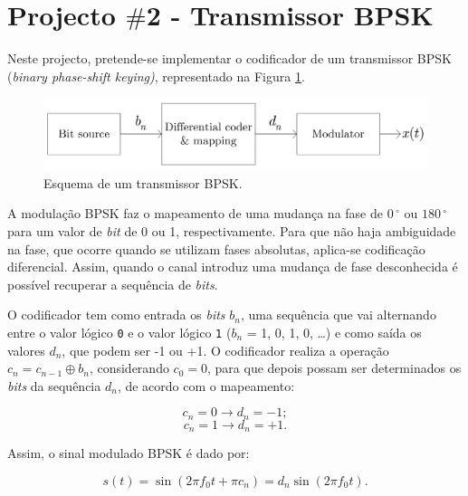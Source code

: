 \documentclass[11pt]{article}
\numberwithin{equation}{section}
\begin{document}
\pagebreak

\section{Projecto $\#$2 - Transmissor BPSK}

Neste projecto, pretende-se implementar o codificador de um transmissor BPSK (\textit{binary phase-shift keying)}, representado na Figura \ref{fig:BPSK}.

\begin{figure}[H]
	\centering
	\includegraphics[keepaspectratio=true, scale=0.5]{teoricas/bpsk}
	\caption{Esquema de um transmissor BPSK.}
	\vspace{-0.8em}
	\label{fig:BPSK}
\end{figure}

A modulação BPSK faz o mapeamento de uma mudança na fase de $0\,^{\circ}$ ou $180\,^{\circ}$ para um valor de \textit{bit} de 0 ou 1, respectivamente. Para que não haja ambiguidade na fase, que ocorre quando se utilizam fases absolutas, aplica-se codificação diferencial. Assim, quando o canal introduz uma mudança de fase desconhecida é possível recuperar a sequência de \textit{bits}.

O codificador tem como entrada os \textit{bits} $b_n$, uma sequência que vai alternando entre o valor lógico \texttt{0} e o valor lógico \texttt{1} ($b_n$ = 1, 0, 1, 0, \ldots) e como saída os valores $d_n$, que podem ser -1 ou +1. O codificador realiza a operação $c_n = c_{n-1} \oplus b_n$, considerando $c_0 = 0$, para que depois possam ser determinados os \textit{bits} da sequência $d_n$, de acordo com o mapeamento:

\vspace{-3mm}
\begin{equation}
	c_{n} = 0 \to d_{n} = -1;
	\label{eq:cn0}
\end{equation}
\begin{equation}	
	c_{n} = 1 \to d_{n} = +1.
	\label{eq:cn1}  
\end{equation} 

\vspace{1mm}
Assim, o sinal modulado BPSK é dado por:

\vspace{-3mm}
\begin{equation}
	s(t) = \sin (2 \pi f_0 t + \pi c_n) = d_n \sin (2 \pi f_0 t).
\end{equation} 
\end{document}
